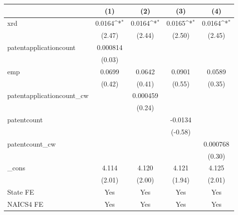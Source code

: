 {
\def\sym#1{\ifmmode^{#1}\else\(^{#1}\)\fi}
\begin{tabular}{l*{4}{c}}
\hline\hline
            &\multicolumn{1}{c}{(1)}         &\multicolumn{1}{c}{(2)}         &\multicolumn{1}{c}{(3)}         &\multicolumn{1}{c}{(4)}         \\
\hline
xrd         &      0.0164\sym{*}  &      0.0164\sym{*}  &      0.0165\sym{*}  &      0.0164\sym{*}  \\
            &      (2.47)         &      (2.44)         &      (2.50)         &      (2.45)         \\
[1em]
patentapplicationcount&    0.000814         &                     &                     &                     \\
            &      (0.03)         &                     &                     &                     \\
[1em]
emp         &      0.0699         &      0.0642         &      0.0901         &      0.0589         \\
            &      (0.42)         &      (0.41)         &      (0.55)         &      (0.35)         \\
[1em]
patentapplicationcount\_cw&                     &    0.000459         &                     &                     \\
            &                     &      (0.24)         &                     &                     \\
[1em]
patentcount &                     &                     &     -0.0134         &                     \\
            &                     &                     &     (-0.58)         &                     \\
[1em]
patentcount\_cw&                     &                     &                     &    0.000768         \\
            &                     &                     &                     &      (0.30)         \\
[1em]
\_cons      &       4.114         &       4.120         &       4.121         &       4.125         \\
            &      (2.01)         &      (2.00)         &      (1.94)         &      (2.01)         \\
[1em]
State FE    &         Yes         &         Yes         &         Yes         &         Yes         \\
[1em]
NAICS4 FE   &         Yes         &         Yes         &         Yes         &         Yes         \\

\end{tabular}}
